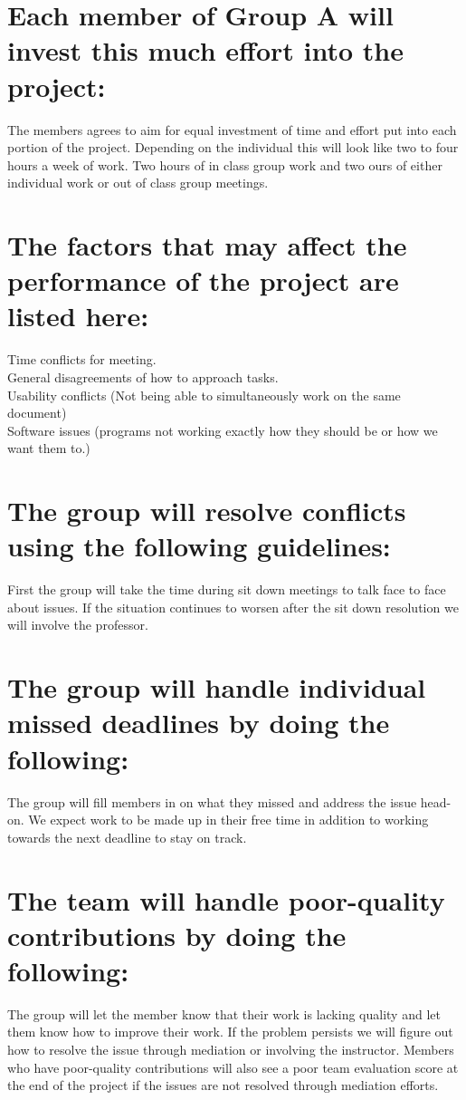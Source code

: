 \documentclass[12pt,A4paper]{article}
\begin{document}
\section{Each member of Group A will invest this much effort into the project:}
	The members agrees to aim for equal investment of time and effort put into each portion of the project. Depending on the individual this will look like two to four hours a week of work. Two hours of in class group work and two ours of either individual work or out of class group meetings. 
\clearpage
\section{The factors that may affect the performance of the project are listed here:}
	\small
	Time conflicts for meeting. \\
	General disagreements of how to approach tasks. \\
	Usability conflicts (Not being able to simultaneously work on the same document) \\
	Software issues (programs not working exactly how they should be or how we want them to.)
	\normalsize
\section{The group will resolve conflicts using the following guidelines:}
	First the group will take the time during sit down meetings to talk face to face about issues. If the situation continues to worsen after the sit down resolution we will involve the professor.
	
\section{The group will handle individual missed deadlines by doing the following:}
	The group will fill members in on what they missed and address the issue head-on. We expect work to be made up in their free time in addition to working towards the next deadline to stay on track.
	
\section{The team will handle poor-quality contributions by doing the following:}
	The group will let the member know that their work is lacking quality and let them know how to improve their work. If the problem persists we will figure out how to resolve the issue through mediation or involving the instructor. Members who have poor-quality contributions will also see a poor team evaluation score at the end of the project if the issues are not resolved through mediation efforts.
	
\end{document}
